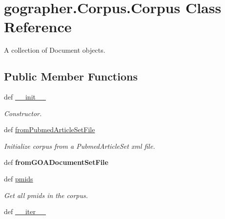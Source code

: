\hypertarget{classgographer_1_1_corpus_1_1_corpus}{\section{gographer.\-Corpus.\-Corpus Class Reference}
\label{classgographer_1_1_corpus_1_1_corpus}
}


A collection of Document objects.  


\subsection*{Public Member Functions}
\begin{DoxyCompactItemize}
\item 
def \hyperlink{classgographer_1_1_corpus_1_1_corpus_a195485571caf401a72a44557d7949557}{\-\_\-\-\_\-init\-\_\-\-\_\-}
\begin{DoxyCompactList}\small\item\em Constructor. \end{DoxyCompactList}\item 
def \hyperlink{classgographer_1_1_corpus_1_1_corpus_add468b80eee651c1a8ec6b14dac4c8b8}{from\-Pubmed\-Article\-Set\-File}
\begin{DoxyCompactList}\small\item\em Initialize corpus from a Pubmed\-Article\-Set xml file. \end{DoxyCompactList}\item 
\hypertarget{classgographer_1_1_corpus_1_1_corpus_a245552b239ed36204503b91b1a4e1e04}{def {\bfseries from\-G\-O\-A\-Document\-Set\-File}}\label{classgographer_1_1_corpus_1_1_corpus_a245552b239ed36204503b91b1a4e1e04}

\item 
def \hyperlink{classgographer_1_1_corpus_1_1_corpus_aceea77b0cf4d1a447e2f572580ce13b6}{pmids}
\begin{DoxyCompactList}\small\item\em Get all pmids in the corpus. \end{DoxyCompactList}\item 
\hypertarget{classgographer_1_1_corpus_1_1_corpus_a3dd29c2a0faec3512387659b1def59ac}{def \hyperlink{classgographer_1_1_corpus_1_1_corpus_a3dd29c2a0faec3512387659b1def59ac}{\-\_\-\-\_\-iter\-\_\-\-\_\-}}\label{classgographer_1_1_corpus_1_1_corpus_a3dd29c2a0faec3512387659b1def59ac}


\end{DoxyCompactItemize}
